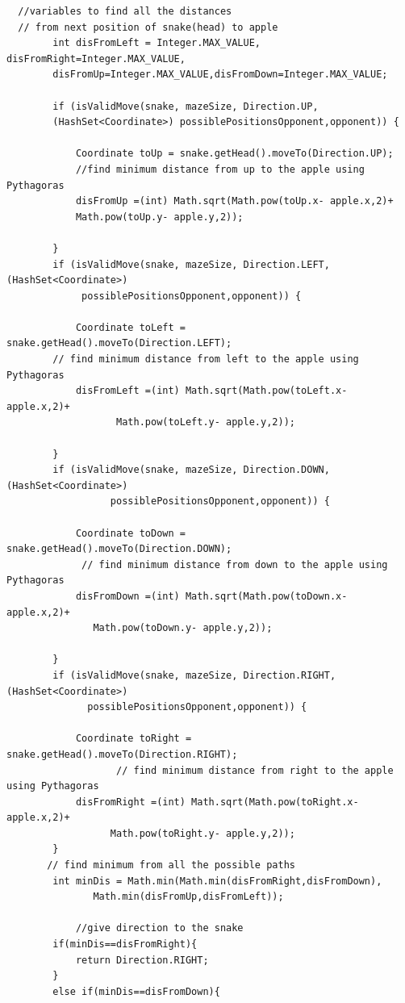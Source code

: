 \documentclass[a4paper,12pt]{article}
\begin{document}
\begin{verbatim}
  //variables to find all the distances 
  // from next position of snake(head) to apple
        int disFromLeft = Integer.MAX_VALUE, disFromRight=Integer.MAX_VALUE,
		disFromUp=Integer.MAX_VALUE,disFromDown=Integer.MAX_VALUE;

        if (isValidMove(snake, mazeSize, Direction.UP, 
		(HashSet<Coordinate>) possiblePositionsOpponent,opponent)) {

            Coordinate toUp = snake.getHead().moveTo(Direction.UP);
            //find minimum distance from up to the apple using Pythagoras
            disFromUp =(int) Math.sqrt(Math.pow(toUp.x- apple.x,2)+
			Math.pow(toUp.y- apple.y,2));

        }
        if (isValidMove(snake, mazeSize, Direction.LEFT,(HashSet<Coordinate>) 
		     possiblePositionsOpponent,opponent)) {

            Coordinate toLeft = snake.getHead().moveTo(Direction.LEFT);
        // find minimum distance from left to the apple using Pythagoras
            disFromLeft =(int) Math.sqrt(Math.pow(toLeft.x- apple.x,2)+
			       Math.pow(toLeft.y- apple.y,2));

        }
        if (isValidMove(snake, mazeSize, Direction.DOWN,(HashSet<Coordinate>) 
		          possiblePositionsOpponent,opponent)) {

            Coordinate toDown = snake.getHead().moveTo(Direction.DOWN);
             // find minimum distance from down to the apple using Pythagoras
            disFromDown =(int) Math.sqrt(Math.pow(toDown.x- apple.x,2)+
			   Math.pow(toDown.y- apple.y,2));

        }
        if (isValidMove(snake, mazeSize, Direction.RIGHT,(HashSet<Coordinate>)
		      possiblePositionsOpponent,opponent)) {

            Coordinate toRight = snake.getHead().moveTo(Direction.RIGHT);
                   // find minimum distance from right to the apple using Pythagoras
            disFromRight =(int) Math.sqrt(Math.pow(toRight.x- apple.x,2)+
			      Math.pow(toRight.y- apple.y,2));
        }
       // find minimum from all the possible paths
        int minDis = Math.min(Math.min(disFromRight,disFromDown),
		       Math.min(disFromUp,disFromLeft));
            
            //give direction to the snake
        if(minDis==disFromRight){
            return Direction.RIGHT;
        } 
        else if(minDis==disFromDown){


\end{verbatim}
\end{document}
